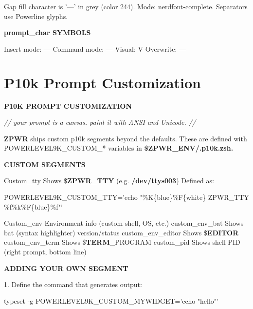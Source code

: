 \documentclass[11pt,a4paper,twoside]{book}
\begin{document}
Gap fill character is '---' in grey (color 244). Mode: nerdfont-complete. Separators use Powerline glyphs.


\vspace{12pt}
{\bfseries\color{neonyellow} prompt\_char SYMBOLS}\vspace{4pt}

Insert mode: ---  Command mode: ---  Visual: V  Overwrite: ---


\vspace{16pt}

\section{P10k Prompt Customization}


\vspace{10pt}
{\large\bfseries\color{neoncyan} P10K PROMPT CUSTOMIZATION}\vspace{6pt}

{\small\itshape\color{dimtext} // your prompt is a canvas. paint it with ANSI and Unicode. //}

\textbf{ZPWR} ships custom p10k segments beyond the defaults. These are defined with POWERLEVEL9K\_CUSTOM\_* variables in \textbf{\$ZPWR\_ENV/.p10k.zsh.}


\vspace{12pt}
{\bfseries\color{neonyellow} CUSTOM SEGMENTS}\vspace{4pt}

Custom\_tty       Shows \$\textbf{ZPWR\_TTY} (e.g. \textbf{\textbf{/dev/ttys003}}) Defined as:

\begin{codebox}
\color{neongreen}POWERLEVEL9K\_CUSTOM\_TTY='echo "\%K\{blue\}\%F\{white\} ZPWR\_TTY \%f\%k\%F\{blue\}\%f"'\\
\end{codebox}

Custom\_env       Environment info (custom shell, OS, etc.) custom\_env\_bat   Shows bat (syntax highlighter) version/status custom\_env\_editor Shows \$\textbf{EDITOR} custom\_env\_term  Shows \$\textbf{TERM}\_PROGRAM custom\_pid       Shows shell PID (right prompt, bottom line)


\vspace{12pt}
{\bfseries\color{neonyellow} ADDING YOUR OWN SEGMENT}\vspace{4pt}

1. Define the command that generates output:

\begin{codebox}
\color{neongreen}typeset -g POWERLEVEL9K\_CUSTOM\_MYWIDGET='echo "hello"'\\
\end{codebox}
\end{document}
